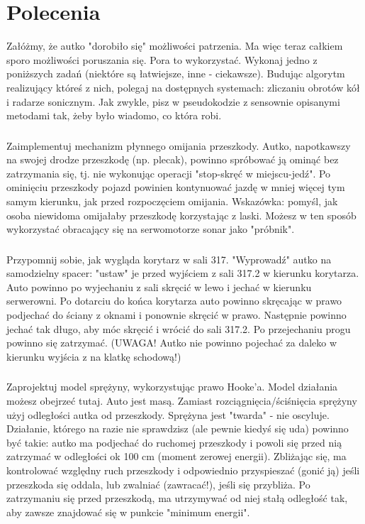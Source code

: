 \documentclass[12pt]{article}
\begin{document}
\section{Polecenia}
Załóżmy, że autko "dorobiło się" możliwości patrzenia. Ma więc teraz całkiem sporo możliwości poruszania się.  Pora to wykorzystać. Wykonaj jedno z poniższych zadań (niektóre są łatwiejsze, inne - ciekawsze). Budując algorytm realizujący któreś z nich, polegaj na dostępnych systemach: zliczaniu obrotów kół i radarze sonicznym. Jak zwykle, pisz w pseudokodzie z sensownie opisanymi metodami tak, żeby było wiadomo, co która robi.
\subsubsection{}Zaimplementuj mechanizm płynnego omijania przeszkody. Autko, napotkawszy na swojej drodze przeszkodę (np. plecak), powinno spróbować ją ominąć bez zatrzymania się, tj. nie wykonując operacji "stop-skręć w miejscu-jedź". Po ominięciu przeszkody pojazd powinien kontynuować jazdę w mniej więcej tym samym kierunku, jak przed rozpoczęciem omijania. Wskazówka: pomyśl, jak osoba niewidoma omijałaby przeszkodę korzystając z laski. Możesz w ten sposób wykorzystać obracający się na serwomotorze sonar jako "próbnik".
\subsubsection{}Przypomnij sobie, jak wygląda korytarz w sali 317. "Wyprowadź" autko na samodzielny spacer: "ustaw" je przed wyjściem z sali 317.2 w kierunku korytarza. Auto powinno po wyjechaniu z sali skręcić w lewo i jechać w kierunku serwerowni. Po dotarciu do końca korytarza auto powinno skręcając w prawo podjechać do ściany z oknami i ponownie skręcić w prawo. Następnie powinno jechać tak długo, aby móc skręcić i wrócić do sali 317.2. Po przejechaniu progu powinno się zatrzymać. (UWAGA! Autko nie powinno pojechać za daleko w kierunku wyjścia z na klatkę schodową!)
\subsubsection{}Zaprojektuj model sprężyny, wykorzystując prawo Hooke'a. Model działania możesz obejrzeć tutaj. Auto jest masą. Zamiast rozciągnięcia/ściśnięcia sprężyny użyj odległości autka od przeszkody. Sprężyna jest "twarda" - nie oscyluje.\\
Działanie, którego na razie nie sprawdzisz (ale pewnie kiedyś się uda) powinno być takie: autko ma podjechać do ruchomej przeszkody i powoli się przed nią zatrzymać w odległości ok 100 cm (moment zerowej energii). Zbliżając się, ma kontrolować względny ruch przeszkody i odpowiednio przyspieszać (gonić ją) jeśli przeszkoda się oddala, lub zwalniać (zawracać!), jeśli się przybliża. Po zatrzymaniu się przed przeszkodą, ma utrzymywać od niej stałą odległość tak, aby zawsze znajdować się w punkcie "minimum energii".
\end{document}
